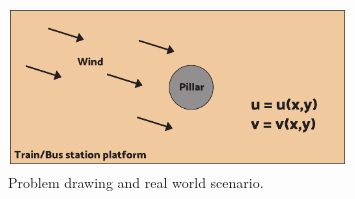 \begin{figure}[H]
    \centering
    \includegraphics[width=0.8\textwidth]{pdf/problem_drawing}
    \caption{Problem drawing and real world scenario.}
    \label{fig:problem_drawing}
\end{figure}
